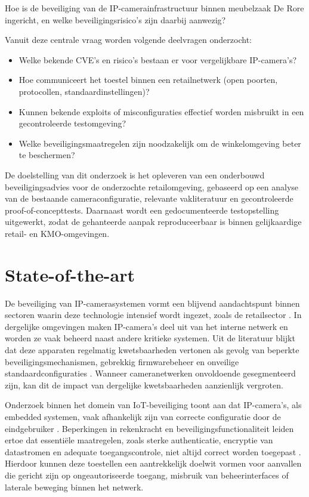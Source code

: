 Hoe is de beveiliging van de \newline IP-camerainfrastructuur binnen meubelzaak De Rore ingericht, 
en welke beveiligingsrisico’s zijn daarbij aanwezig?


Vanuit deze centrale vraag worden volgende deelvragen onderzocht:
\begin{itemize}
    \item Welke bekende CVE’s en risico’s bestaan er voor vergelijkbare IP-camera’s?
    \item Hoe communiceert het toestel binnen een retailnetwerk (open poorten, protocollen, standaardinstellingen)?
    \item Kunnen bekende exploits of misconfiguraties effectief worden misbruikt in een gecontroleerde testomgeving?
    \item Welke beveiligingsmaatregelen zijn noodzakelijk om de winkelomgeving beter te beschermen?
\end{itemize}

De doelstelling van dit onderzoek is het opleveren van een onderbouwd beveiligingsadvies voor de onderzochte retailomgeving, 
gebaseerd op een analyse van de bestaande cameraconfiguratie, relevante vakliteratuur en gecontroleerde proof-of-concepttests. 
Daarnaast wordt een gedocumenteerde testopstelling uitgewerkt, zodat de gehanteerde aanpak reproduceerbaar is binnen gelijkaardige retail- en KMO-omgevingen.

\section{State-of-the-art}

De beveiliging van IP-camerasystemen vormt een blijvend aandachtspunt binnen sectoren waarin deze technologie intensief wordt ingezet, zoals de retailsector \parencite{ENISA2024}. In dergelijke omgevingen maken IP-camera’s deel uit van het interne netwerk en worden ze vaak beheerd naast andere kritieke systemen. Uit de literatuur blijkt dat deze apparaten regelmatig kwetsbaarheden vertonen als gevolg van beperkte beveiligingsmechanismen, gebrekkig firmwarebeheer en onveilige standaardconfiguraties \parencite{Butun2019}. Wanneer cameranetwerken onvoldoende gesegmenteerd zijn, kan dit de impact van dergelijke kwetsbaarheden aanzienlijk vergroten.

Onderzoek binnen het domein van IoT-beveiliging toont aan dat IP-camera’s, als embedded systemen, vaak afhankelijk zijn van correcte configuratie door de eindgebruiker \parencite{Butun2019}. Beperkingen in rekenkracht en beveiligingsfunctionaliteit leiden ertoe dat essentiële maatregelen, zoals sterke authenticatie, encryptie van datastromen en adequate toegangscontrole, niet altijd correct worden toegepast \parencite{Butun2019}. Hierdoor kunnen deze toestellen een aantrekkelijk doelwit vormen voor aanvallen die gericht zijn op ongeautoriseerde toegang, misbruik van beheerinterfaces of laterale beweging binnen het netwerk.

